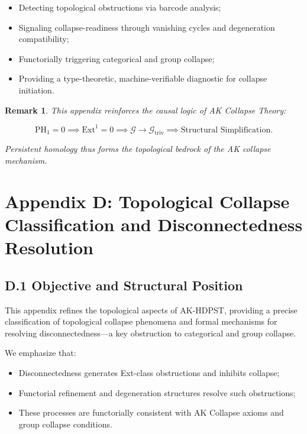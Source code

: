 \documentclass[11pt]{article}
\newtheorem{remark}[theorem]{Remark}
\begin{document}
\begin{itemize}
    \item Detecting topological obstructions via barcode analysis;
    \item Signaling collapse-readiness through vanishing cycles and degeneration compatibility;
    \item Functorially triggering categorical and group collapse;
    \item Providing a type-theoretic, machine-verifiable diagnostic for collapse initiation.
\end{itemize}

\begin{remark}
This appendix reinforces the causal logic of AK Collapse Theory:

\[
\mathrm{PH}_1 = 0 \implies \mathrm{Ext}^1 = 0 \implies \mathcal{G} \longrightarrow \mathcal{G}_{\mathrm{triv}} \implies \text{Structural Simplification}.
\]

Persistent homology thus forms the topological bedrock of the AK collapse mechanism.

\end{remark}



\section*{Appendix D: Topological Collapse Classification and Disconnectedness Resolution}

\subsection*{D.1 Objective and Structural Position}

This appendix refines the topological aspects of AK-HDPST, providing a precise classification of topological collapse phenomena and formal mechanisms for resolving disconnectedness—a key obstruction to categorical and group collapse.

We emphasize that:

\begin{itemize}
    \item Disconnectedness generates Ext-class obstructions and inhibits collapse;
    \item Functorial refinement and degeneration structures resolve such obstructions;
    \item These processes are functorially consistent with AK Collapse axioms and group collapse conditions.
\end{itemize}
\end{document}
